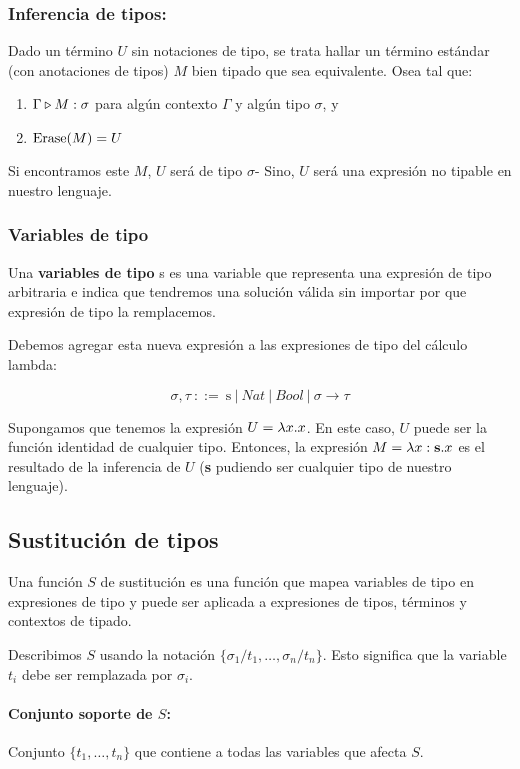 \subsubsection*{Inferencia de tipos:} Dado un término $U$ sin notaciones de tipo, se trata hallar un término estándar (con anotaciones de tipos) $M$ bien tipado que sea equivalente. Osea tal que:
\begin{enumerate}
	\item $\Gamma\triangleright M : \sigma$ para algún contexto $\Gamma$ y algún tipo $\sigma$, y
	\item $\operatorname{Erase}(M) = U$
\end{enumerate}

Si encontramos este $M$, $U$ será de tipo $\sigma$- Sino, $U$ será una expresión no tipable en nuestro lenguaje.


\subsubsection{Variables de tipo}
Una \textbf{variables de tipo} s es una variable que representa una expresión de tipo arbitraria e indica que tendremos una solución válida sin importar por que expresión de tipo la remplacemos.

Debemos agregar esta nueva expresión a las expresiones  de tipo del cálculo lambda:

$$\sigma,\tau~::=~\text{s}~|~Nat~|~Bool~|~\sigma\to\tau$$

Supongamos que tenemos la expresión $U = \lambda x. x$. En este caso, $U$ puede ser la función identidad de cualquier tipo.
Entonces, la expresión $M=\lambda x: \textbf{s} . x$ es el resultado de la inferencia de $U$ (\textbf{s} pudiendo ser cualquier tipo de nuestro lenguaje).



\subsection{Sustitución de tipos}
Una función $S$ de sustitución es una función que mapea variables de tipo en expresiones de tipo y puede ser aplicada a expresiones de tipos, términos y contextos de tipado.

Describimos $S$ usando la notación $\{\sigma_1/t_1,\dots,\sigma_n/t_n\}$. Esto significa que la variable $t_i$ debe ser remplazada por $\sigma_i$.

\paragraph{Conjunto soporte de $S$:} Conjunto $\{t_1,\dots,t_n\}$ que contiene a todas las variables que afecta $S$.

